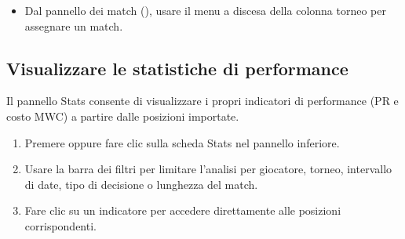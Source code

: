 \documentclass[letterpaper,10pt,italian]{sphinxmanual}
\begin{document}
\sphinxAtStartPar
{}
\begin{itemize}
\item {} 
\sphinxAtStartPar
Dal pannello dei match (), usare il menu a discesa della colonna torneo per assegnare un match.

\end{itemize}


\subsection{Visualizzare le statistiche di performance}
\label{\detokenize{guide_utilisateur:afficher-les-statistiques-de-performance}}
\sphinxAtStartPar
Il pannello Stats consente di visualizzare i propri indicatori di performance (PR e costo MWC) a partire dalle posizioni importate.
\begin{enumerate}
%
\item {} 
\sphinxAtStartPar
Premere  oppure fare clic sulla scheda Stats nel pannello inferiore.

\item {} 
\sphinxAtStartPar
Usare la barra dei filtri per limitare l’analisi per giocatore, torneo, intervallo di date, tipo di decisione o lunghezza del match.

\item {} 
\sphinxAtStartPar
Fare clic su un indicatore per accedere direttamente alle posizioni corrispondenti.

\end{enumerate}
\end{document}
